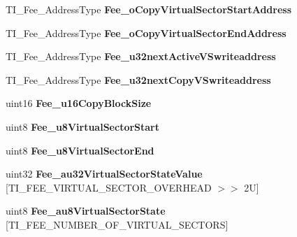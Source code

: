 \begin{DoxyCompactItemize}
T\+I\+\_\+\+Fee\+\_\+\+Address\+Type {\bfseries Fee\+\_\+o\+Copy\+Virtual\+Sector\+Start\+Address}
\item 
\mbox{\label{structTI__Fee__GlobalVarsType_a04638451eebe362b14f93a5000911366}} 
T\+I\+\_\+\+Fee\+\_\+\+Address\+Type {\bfseries Fee\+\_\+o\+Copy\+Virtual\+Sector\+End\+Address}
\item 
\mbox{\label{structTI__Fee__GlobalVarsType_a48dcb82e628aa59b15ddbab93ff3eddb}} 
T\+I\+\_\+\+Fee\+\_\+\+Address\+Type {\bfseries Fee\+\_\+u32next\+Active\+V\+Swriteaddress}
\item 
\mbox{\label{structTI__Fee__GlobalVarsType_ad81ad263852e15254ec2fdd5320965c3}} 
T\+I\+\_\+\+Fee\+\_\+\+Address\+Type {\bfseries Fee\+\_\+u32next\+Copy\+V\+Swriteaddress}
\item 
\mbox{\label{structTI__Fee__GlobalVarsType_a15412adc90f3d748601417b0d50fb223}} 
uint16 {\bfseries Fee\+\_\+u16\+Copy\+Block\+Size}
\item 
\mbox{\label{structTI__Fee__GlobalVarsType_a30fa5e88ffd68f83307373c010a1e5a4}} 
uint8 {\bfseries Fee\+\_\+u8\+Virtual\+Sector\+Start}
\item 
\mbox{\label{structTI__Fee__GlobalVarsType_ab5e08d3dfd1c72431f26ea8b0df6f4f4}} 
uint8 {\bfseries Fee\+\_\+u8\+Virtual\+Sector\+End}
\item 
\mbox{\label{structTI__Fee__GlobalVarsType_adeaae97b2f348902f6f8a6da65730110}} 
uint32 {\bfseries Fee\+\_\+au32\+Virtual\+Sector\+State\+Value} \mbox{[}T\+I\+\_\+\+F\+E\+E\+\_\+\+V\+I\+R\+T\+U\+A\+L\+\_\+\+S\+E\+C\+T\+O\+R\+\_\+\+O\+V\+E\+R\+H\+E\+AD $>$$>$ 2\+U\mbox{]}
\item 
\mbox{\label{structTI__Fee__GlobalVarsType_a604bb3d29c044b5dc04cb43fa4c78a29}} 
uint8 {\bfseries Fee\+\_\+au8\+Virtual\+Sector\+State} \mbox{[}T\+I\+\_\+\+F\+E\+E\+\_\+\+N\+U\+M\+B\+E\+R\+\_\+\+O\+F\+\_\+\+V\+I\+R\+T\+U\+A\+L\+\_\+\+S\+E\+C\+T\+O\+RS\mbox{]}
\item 
\mbox{\label{structTI__Fee__GlobalVarsType_ac4a0a1fbd37ef70b909aa1c474a893a8}} 
$$
\end{DoxyCompactItemize}
